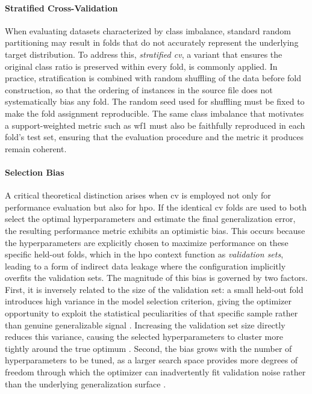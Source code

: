 \paragraph{Stratified Cross-Validation}
When evaluating datasets characterized by class imbalance, standard random partitioning may result in folds that do not accurately represent the underlying target distribution. To address this, \textit{stratified \gls{cv}}, a variant that ensures the original class ratio is preserved within every fold, is commonly applied. In practice, stratification is combined with random shuffling of the data before fold construction, so that the ordering of instances in the source file does not systematically bias any fold. The random seed used for shuffling must be fixed to make the fold assignment reproducible. The same class imbalance that motivates a support-weighted metric such as \gls{wf1} must also be faithfully reproduced in each fold's test set, ensuring that the evaluation procedure and the metric it produces remain coherent.

\paragraph{Selection Bias}
A critical theoretical distinction arises when \gls{cv} is employed not only for performance evaluation but also for \gls{hpo}. If the identical \gls{cv} folds are used to both select the optimal hyperparameters and estimate the final generalization error, the resulting performance metric exhibits an optimistic bias. This occurs because the hyperparameters are explicitly chosen to maximize performance on these specific held-out folds, which in the \gls{hpo} context function as \textit{validation sets}, leading to a form of indirect data leakage where the configuration implicitly overfits the validation sets. The magnitude of this bias is governed by two factors. First, it is inversely related to the size of the validation set: a small held-out fold introduces high variance in the model selection criterion, giving the optimizer opportunity to exploit the statistical peculiarities of that specific sample rather than genuine generalizable signal \parencite{cawleyOverfittingModelSelection2010}. Increasing the validation set size directly reduces this variance, causing the selected hyperparameters to cluster more tightly around the true optimum \parencite{cawleyOverfittingModelSelection2010}. Second, the bias grows with the number of hyperparameters to be tuned, as a larger search space provides more degrees of freedom through which the optimizer can inadvertently fit validation noise rather than the underlying generalization surface \parencite{cawleyOverfittingModelSelection2010}.

